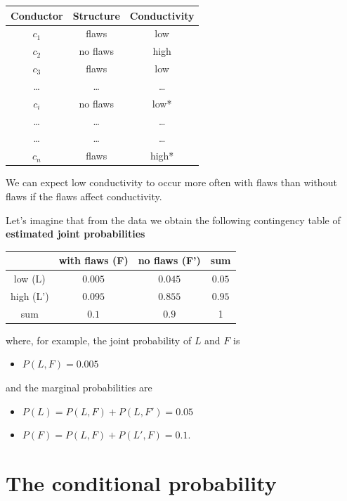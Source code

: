 \documentclass[
]{book}
\providecommand{\tightlist}{%
  \setlength{\itemsep}{0pt}\setlength{\parskip}{0pt}}
\begin{document}
\begin{longtable}[]{@{}ccc@{}}
\toprule\noalign{}
Conductor & Structure & Conductivity \\
\midrule\noalign{}
\endhead
\bottomrule\noalign{}
\endlastfoot
\(c_1\) & flaws & low \\
\(c_2\) & no flaws & high \\
\(c_3\) & flaws & low \\
\ldots{} & \ldots{} & \ldots{} \\
\(c_i\) & no flaws & low* \\
\ldots{} & \ldots{} & \ldots{} \\
\ldots{} & \ldots{} & \ldots{} \\
\(c_n\) & flaws & high* \\
\end{longtable}

We can expect low conductivity to occur more often with flaws than without flaws if the flaws affect conductivity.

Let's imagine that from the data we obtain the following contingency table of \textbf{estimated joint probabilities}

\begin{longtable}[]{@{}cccc@{}}
\toprule\noalign{}
& with flaws (F) & no flaws (F') & sum \\
\midrule\noalign{}
\endhead
\bottomrule\noalign{}
\endlastfoot
low (L) & \(0.005\) & \(0.045\) & \(0.05\) \\
high (L') & \(0.095\) & \(0.855\) & \(0.95\) \\
sum & \(0.1\) & \(0.9\) & 1 \\
\end{longtable}

where, for example, the joint probability of \(L\) and \(F\) is

\begin{itemize}
\tightlist
\item
  \(P(L,F )=0.005\)
\end{itemize}

and the marginal probabilities are

\begin{itemize}
\tightlist
\item
  \(P(L)=P(L, F) + P(L, F')=0.05\)
\item
  \(P(F)=P(L, F) + P(L', F)= 0.1\).
\end{itemize}

\hypertarget{the-conditional-probability}{%
\section{The conditional probability}\label{the-conditional-probability}}
\end{document}
